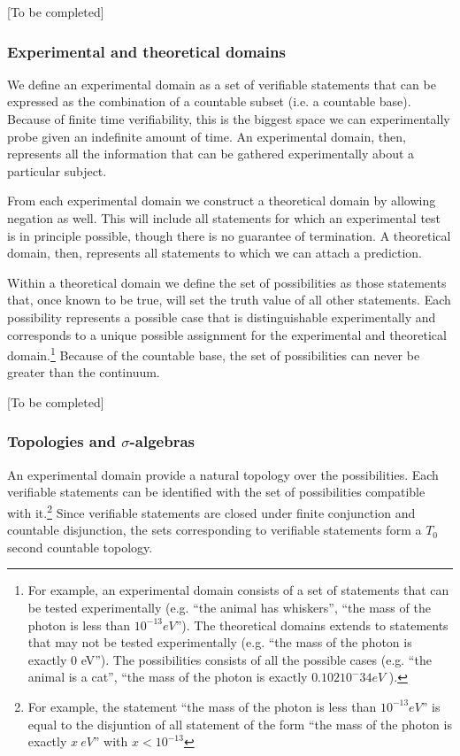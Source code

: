 \documentclass[twocolumn]{article}
\begin{document}
[To be completed]


\subsubsection{Experimental and theoretical domains}

We define an experimental domain as a set of verifiable statements that can be expressed as the combination of a countable subset (i.e. a countable base). Because of finite time verifiability, this is the biggest space we can experimentally probe given an indefinite amount of time. An experimental domain, then, represents all the information that can be gathered experimentally about a particular subject.

From each experimental domain we construct a theoretical domain by allowing negation as well. This will include all statements for which an experimental test is in principle possible, though there is no guarantee of termination. A theoretical domain, then, represents all statements to which we can attach a prediction.

Within a theoretical domain we define the set of possibilities as those statements that, once known to be true, will set the truth value of all other statements. Each possibility represents a possible case that is distinguishable experimentally and corresponds to a unique possible assignment for the experimental and theoretical domain.\footnote{For example, an experimental domain consists of a set of statements that can be tested experimentally (e.g. ``the animal has whiskers'', ``the mass of the photon is less than $10^{-13} eV$''). The theoretical domains extends to statements that may not be tested experimentally (e.g. ``the mass of the photon is exactly 0 eV''). The possibilities consists of all the possible cases (e.g. ``the animal is a cat'', ``the mass of the photon is exactly $0.102 10^-{34} eV$ ).} Because of the countable base, the set of possibilities can never be greater than the continuum.

[To be completed]


\subsubsection{Topologies and $\sigma$-algebras}

An experimental domain provide a natural topology over the possibilities. Each verifiable statements can be identified with the set of possibilities compatible with it.\footnote{For example, the statement ``the mass of the photon is less than $10^{-13} eV$'' is equal to the disjuntion of all statement of the form ``the mass of the photon is exactly $x~eV$'' with $x <  10^{-13}$} Since verifiable statements are closed under finite conjunction and countable disjunction, the sets corresponding to verifiable statements form a $T_0$ second countable topology.
\end{document}
